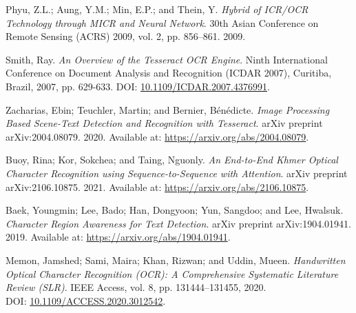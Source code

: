 Phyu, Z.L.; Aung, Y.M.; Min, E.P.; and Thein, Y.
\textit{Hybrid of ICR/OCR Technology through MICR and Neural Network}.
30th Asian Conference on Remote Sensing (ACRS) 2009, vol. 2, pp. 856–861.
2009.

Smith, Ray.
\textit{An Overview of the Tesseract OCR Engine}.
Ninth International Conference on Document Analysis and Recognition (ICDAR 2007), Curitiba, Brazil, 2007, pp. 629-633.
DOI: \href{https://doi.org/10.1109/ICDAR.2007.4376991}{10.1109/ICDAR.2007.4376991}.

Zacharias, Ebin; Teuchler, Martin; and Bernier, Bénédicte.
\textit{Image Processing Based Scene-Text Detection and Recognition with Tesseract}.
arXiv preprint arXiv:2004.08079.
2020.
Available at: \href{https://arxiv.org/abs/2004.08079}{https://arxiv.org/abs/2004.08079}.

Buoy, Rina; Kor, Sokchea; and Taing, Nguonly.
\textit{An End-to-End Khmer Optical Character Recognition using Sequence-to-Sequence with Attention}.
arXiv preprint arXiv:2106.10875.
2021.
Available at: \href{https://arxiv.org/abs/2106.10875}{https://arxiv.org/abs/2106.10875}.

Baek, Youngmin; Lee, Bado; Han, Dongyoon; Yun, Sangdoo; and Lee, Hwalsuk.
\textit{Character Region Awareness for Text Detection}.
arXiv preprint arXiv:1904.01941.
2019.
Available at: \href{https://arxiv.org/abs/1904.01941}{https://arxiv.org/abs/1904.01941}.

Memon, Jamshed; Sami, Maira; Khan, Rizwan; and Uddin, Mueen. 
\textit{Handwritten Optical Character Recognition (OCR): A Comprehensive Systematic Literature Review (SLR)}. 
IEEE Access, vol. 8, pp. 131444--131455, 2020. \\
DOI: \href{https://doi.org/10.1109/ACCESS.2020.3012542}{10.1109/ACCESS.2020.3012542}.
